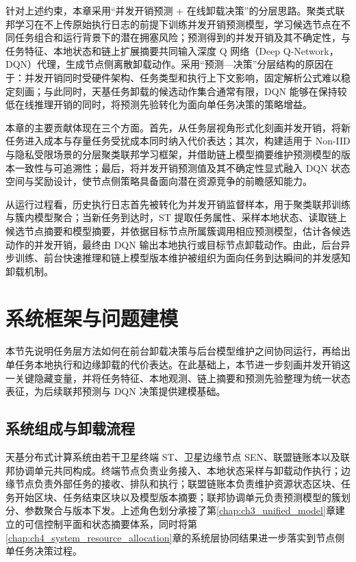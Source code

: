 针对上述约束，本章采用“并发开销预测 + 在线卸载决策”的分层思路。聚类式联邦学习在不上传原始执行日志的前提下训练并发开销预测模型，学习候选节点在不同任务组合和运行背景下的潜在拥塞风险；预测得到的并发开销及其不确定性，与任务特征、本地状态和链上扩展摘要共同输入深度 Q 网络（Deep Q-Network， DQN）代理，生成节点侧离散卸载动作。采用“预测—决策”分层结构的原因在于：并发开销同时受硬件架构、任务类型和执行上下文影响，固定解析公式难以稳定刻画；与此同时，天基任务卸载的候选动作集合通常有限，DQN 能够在保持较低在线推理开销的同时，将预测先验转化为面向单任务决策的策略增益。

本章的主要贡献体现在三个方面。首先，从任务层视角形式化刻画并发开销，将新任务进入成本与存量任务受扰成本同时纳入代价表达；其次，构建适用于 Non-IID 与隐私受限场景的分层聚类联邦学习框架，并借助链上模型摘要维护预测模型的版本一致性与可追溯性；最后，将并发开销预测值及其不确定性显式融入 DQN 状态空间与奖励设计，使节点侧策略具备面向潜在资源竞争的前瞻感知能力。

从运行过程看，历史执行日志首先被转化为并发开销监督样本，用于聚类联邦训练与簇内模型聚合；当新任务到达时，ST 提取任务属性、采样本地状态、读取链上候选节点摘要和模型摘要，并依据目标节点所属簇调用相应预测模型，估计各候选动作的并发开销，最终由 DQN 输出本地执行或目标节点卸载动作。由此，后台异步训练、前台快速推理和链上模型版本维护被组织为面向任务到达瞬间的并发感知卸载机制。

\section{系统框架与问题建模}
\label{sec:ch5_modeling}
本节先说明任务层方法如何在前台卸载决策与后台模型维护之间协同运行，再给出单任务本地执行和边缘卸载的代价表达。在此基础上，本节进一步刻画并发开销这一关键隐藏变量，并将任务特征、本地观测、链上摘要和预测先验整理为统一状态表征，为后续联邦预测与 DQN 决策提供建模基础。

\subsection{系统组成与卸载流程}

天基分布式计算系统由若干卫星终端 ST、卫星边缘节点 SEN、联盟链账本以及联邦协调单元共同构成。终端节点负责业务接入、本地状态采样与卸载动作执行；边缘节点负责外部任务的接收、排队和执行；联盟链账本负责维护资源状态区块、任务开始区块、任务结束区块以及模型版本摘要；联邦协调单元负责预测模型的簇划分、参数聚合与版本下发。上述角色划分承接了第\ref{chap:ch3_unified_model}章建立的可信控制平面和状态摘要体系，同时将第\ref{chap:ch4_system_resource_allocation}章的系统层协同结果进一步落实到节点侧单任务决策过程。

